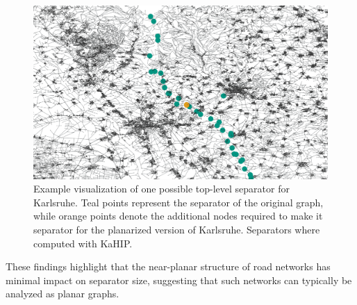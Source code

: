 \begin{figure}
	\centering
	\includegraphics[width=0.8\linewidth]{graphics/karlsruhe_top_level_sep_extended_to_planar_wide.png}
	\caption{Example visualization of one possible top-level separator for
		Karlsruhe. Teal points represent the separator of the original graph, while
		orange points denote the additional nodes required to make it separator
		for the planarized version of Karlsruhe. Separators where computed with
		KaHIP.} \label{fig:karlsruhe_planar_vs_non_planar}
\end{figure}

These findings highlight that the near-planar structure of road networks has
minimal impact on separator size, suggesting that such networks can typically
be analyzed as planar graphs.
